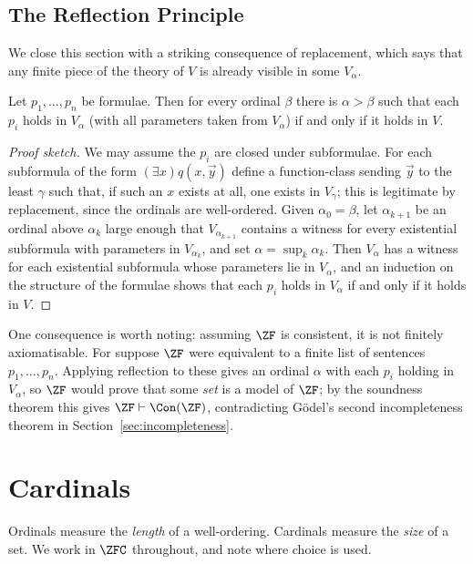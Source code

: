 \subsection{The Reflection Principle}

We close this section with a striking consequence of replacement, which says that any finite piece of the theory of $V$ is already visible in some $V_\alpha$.

\begin{theorem}
  Let $p_1, \dots, p_n$ be formulae. Then for every ordinal $\beta$ there is $\alpha > \beta$ such that each $p_i$ holds in $V_\alpha$ (with all parameters taken from $V_\alpha$) if and only if it holds in $V$.
\end{theorem}
\begin{proof}[Proof sketch]
  We may assume the $p_i$ are closed under subformulae. For each subformula of the form $(\exists x) q(x, \vec y)$ define a function-class sending $\vec y$ to the least $\gamma$ such that, if such an $x$ exists at all, one exists in $V_\gamma$; this is legitimate by replacement, since the ordinals are well-ordered. Given $\alpha_0 = \beta$, let $\alpha_{k+1}$ be an ordinal above $\alpha_k$ large enough that $V_{\alpha_{k+1}}$ contains a witness for every existential subformula with parameters in $V_{\alpha_k}$, and set $\alpha = \sup_k \alpha_k$. Then $V_\alpha$ has a witness for each existential subformula whose parameters lie in $V_\alpha$, and an induction on the structure of the formulae shows that each $p_i$ holds in $V_\alpha$ if and only if it holds in $V$.
\end{proof}

One consequence is worth noting: assuming $\ZF$ is consistent, it is not finitely axiomatisable. For suppose $\ZF$ were equivalent to a finite list of sentences $p_1, \dots, p_n$. Applying reflection to these gives an ordinal $\alpha$ with each $p_i$ holding in $V_\alpha$, so $\ZF$ would prove that some \emph{set} is a model of $\ZF$; by the soundness theorem this gives $\ZF \vdash \Con(\ZF)$, contradicting G\"odel's second incompleteness theorem in Section~\ref{sec:incompleteness}.

\section{Cardinals}\label{sec:cardinals}

Ordinals measure the \emph{length} of a well-ordering. Cardinals measure the \emph{size} of a set. We work in $\ZFC$ throughout, and note where choice is used.


